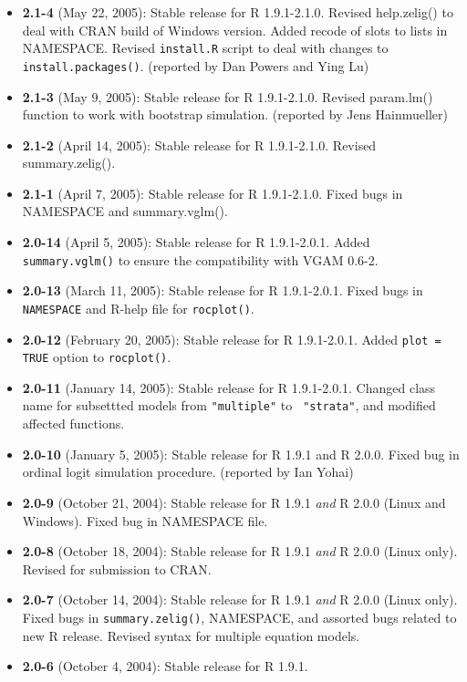 \begin{itemize}
\item \textbf{2.1-4} (May 22, 2005):  Stable release for R 1.9.1-2.1.0.  Revised help.zelig()
  to deal with CRAN build of Windows version.  Added recode of slots to lists    
  in NAMESPACE.  Revised {\tt install.R} script to deal with changes to {\tt install.packages()}.  (reported by Dan Powers and 
Ying Lu)

\item \textbf{2.1-3} (May 9, 2005):  Stable release for R 1.9.1-2.1.0.  
Revised param.lm() function to work with bootstrap simulation.  (reported 
by Jens Hainmueller)

\item \textbf{2.1-2} (April 14, 2005):  Stable release for R 1.9.1-2.1.0.  
Revised summary.zelig(). 
\item \textbf{2.1-1} (April 7, 2005):  Stable release for R 1.9.1-2.1.0.  
Fixed bugs in 
  NAMESPACE and summary.vglm().
\item \textbf{2.0-14} (April 5, 2005): Stable release for R
  1.9.1-2.0.1. Added {\tt summary.vglm()} to ensure the compatibility with VGAM 0.6-2.
\item \textbf{2.0-13} (March 11, 2005): Stable release for R 1.9.1-2.0.1.  
Fixed bugs in {\tt NAMESPACE} and R-help file for {\tt rocplot()}.  
\item \textbf{2.0-12} (February 20, 2005): Stable release for R 
1.9.1-2.0.1.  Added {\tt plot = TRUE} option to {\tt rocplot()}.  
\item \textbf{2.0-11} (January 14, 2005): Stable release for R 1.9.1-2.0.1.  
Changed class name for subsettted models from {\tt "multiple"} to {\tt 
"strata"}, and modified affected functions.  
\item \textbf{2.0-10} (January 5, 2005): Stable release for R 1.9.1 and R 
2.0.0.  Fixed bug in ordinal logit simulation procedure.  (reported by Ian 
Yohai)
\item \textbf{2.0-9} (October 21, 2004): Stable release for R 1.9.1 
\emph{and} R 2.0.0 (Linux and Windows).  Fixed bug in NAMESPACE file.  
\item \textbf{2.0-8} (October 18, 2004): Stable release for R 1.9.1 
\emph{and} R 2.0.0 (Linux only).  Revised for submission to CRAN.  
\item \textbf{2.0-7} (October 14, 2004): Stable release for R 1.9.1 \emph{and} R 2.0.0 (Linux 
only).  Fixed bugs in {\tt summary.zelig()},  NAMESPACE, and assorted bugs related to new R 
release.  Revised syntax for multiple equation models.  
\item \textbf{2.0-6} (October 4, 2004): Stable release for R 1.9.1.

\end{itemize}
